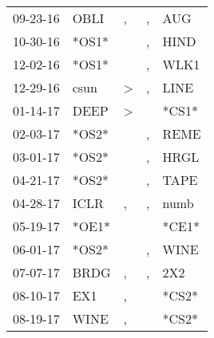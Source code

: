 \begin{supertabular}{p{0.07\textwidth}p{0.06\textwidth}p{0.02\textwidth}p{0.02\textwidth}p{0.06\textwidth}}
          09-23-16\textsuperscript{} &           OBLI\textsuperscript{} &                , &                , &            AUG\textsuperscript{} \\
          10-30-16\textsuperscript{} &                            *OS1* &                  &                , &           HIND\textsuperscript{} \\
          12-02-16\textsuperscript{} &                            *OS1* &                  &                , &           WLK1\textsuperscript{} \\
          12-29-16\textsuperscript{} &           csun\textsuperscript{} &     \textgreater &                , &           LINE\textsuperscript{} \\
          01-14-17\textsuperscript{} &           DEEP\textsuperscript{} &     \textgreater &                  &                            *CS1* \\
          02-03-17\textsuperscript{} &                            *OS2* &                  &                , &           REME\textsuperscript{} \\
          03-01-17\textsuperscript{} &                            *OS2* &                  &                , &           HRGL\textsuperscript{} \\
          04-21-17\textsuperscript{} &                            *OS2* &                  &                , &           TAPE\textsuperscript{} \\
          04-28-17\textsuperscript{} &           ICLR\textsuperscript{} &                , &                , &           numb\textsuperscript{} \\
          05-19-17\textsuperscript{} &                            *OE1* &                  &                  &                            *CE1* \\
          06-01-17\textsuperscript{} &                            *OS2* &                  &                , &           WINE\textsuperscript{} \\
          07-07-17\textsuperscript{} &           BRDG\textsuperscript{} &                , &                , &            2X2\textsuperscript{} \\
          08-10-17\textsuperscript{} &            EX1\textsuperscript{} &                , &                  &                            *CS2* \\
          08-19-17\textsuperscript{} &           WINE\textsuperscript{} &                , &                  &                            *CS2* \\

\end{supertabular}
